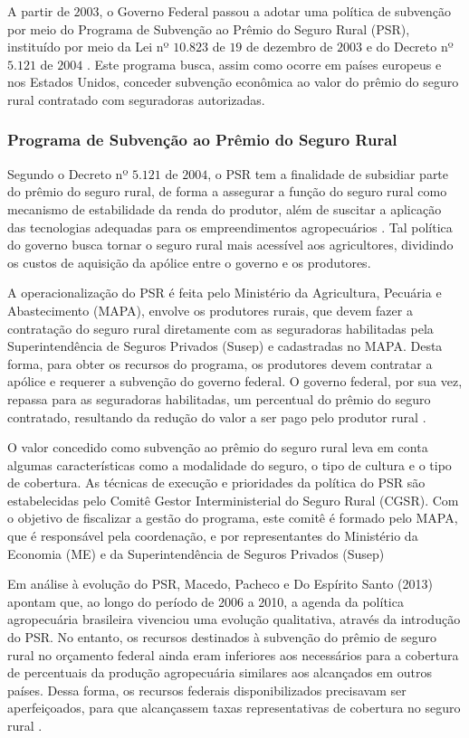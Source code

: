\documentclass[12pt,a4paper]{article}
\begin{document}
A partir de $2003$, o Governo Federal passou a adotar uma política de subvenção por meio do Programa de Subvenção ao Prêmio do Seguro Rural (PSR), instituído por meio da Lei nº $10.823$ de $19$ de dezembro de $2003$ e do Decreto nº $5.121$ de $2004$ \cite{brasil18}. Este programa busca, assim como ocorre em países europeus e nos Estados Unidos, conceder subvenção econômica ao valor do prêmio do seguro rural contratado com seguradoras autorizadas.

\subsubsection{Programa de Subvenção ao Prêmio do Seguro Rural}

Segundo o Decreto nº $5.121$ de $2004$, o PSR tem a finalidade de subsidiar parte do prêmio do seguro rural, de forma a assegurar a função do seguro rural como mecanismo de estabilidade da renda do produtor, além de suscitar a aplicação das tecnologias adequadas para os empreendimentos agropecuários \cite{guia_20}. Tal política do governo busca tornar o seguro rural mais acessível aos agricultores, dividindo os custos de aquisição da apólice entre o governo e os produtores. 

A operacionalização do PSR é feita pelo Ministério da Agricultura, Pecuária e Abastecimento (MAPA), envolve os produtores rurais, que devem fazer a contratação do seguro rural diretamente com as seguradoras habilitadas pela Superintendência de Seguros Privados (Susep) e cadastradas no MAPA. Desta forma, para obter os recursos do programa, os produtores devem contratar a apólice e requerer a subvenção do governo federal. O governo federal, por sua vez, repassa para as seguradoras habilitadas, um percentual do prêmio do seguro contratado, resultando da redução do valor a ser pago pelo produtor rural \cite{silva14}.

O valor concedido como subvenção ao prêmio do seguro rural leva em conta algumas características como a modalidade do seguro, o tipo de cultura e o tipo de cobertura. As técnicas de execução e prioridades da política do PSR são estabelecidas pelo Comitê Gestor Interministerial do Seguro Rural (CGSR). Com o objetivo de fiscalizar a gestão do programa, este comitê é formado pelo MAPA, que é responsável pela coordenação, e por representantes do Ministério da Economia (ME) e da Superintendência de Seguros Privados (Susep) \cite{brasil21_2} 

Em análise à evolução do PSR, Macedo, Pacheco e Do Espírito Santo (2013) apontam que, ao longo do período de 2006 a 2010, a agenda da política agropecuária brasileira vivenciou uma evolução qualitativa, através da introdução do PSR. No entanto, os recursos destinados à subvenção do prêmio de seguro rural no orçamento federal ainda eram inferiores aos necessários para a cobertura de percentuais da produção agropecuária similares aos alcançados em outros países. Dessa forma, os recursos federais disponibilizados precisavam ser aperfeiçoados, para que alcançassem taxas representativas de cobertura no seguro rural \cite{macedo13_g}. 
\end{document}
